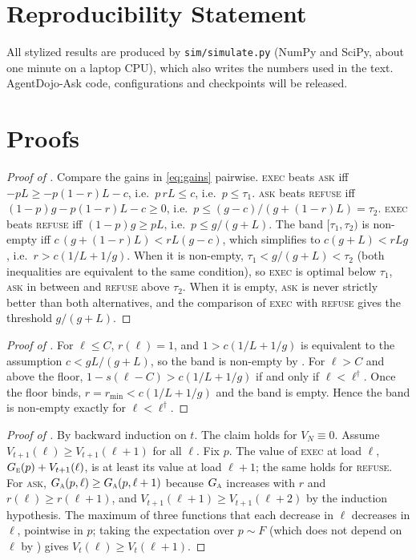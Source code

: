 \documentclass[10pt]{article}
\newcommand{\ASK}{\textup{\textsc{ask}}\xspace}
\newcommand{\EXEC}{\textup{\textsc{exec}}\xspace}
\newcommand{\REFUSE}{\textup{\textsc{refuse}}\xspace}
\newcommand{\ADA}{AgentDojo-Ask\xspace}
\theoremstyle{plain}
\theoremstyle{definition}
\begin{document}
\section*{Reproducibility Statement}
All stylized results are produced by \texttt{sim/simulate.py} (NumPy and SciPy, about one minute on a laptop CPU), which also writes the numbers used in the text. \ADA code, configurations and checkpoints will be released.




\clearpage
\appendix

\section{Proofs}\label{app:proofs}

\begin{proof}[Proof of ]
Compare the gains in \eqref{eq:gains} pairwise. \EXEC beats \ASK iff $-pL\ge -p(1-r)L-c$, i.e.\ $p\,rL\le c$, i.e.\ $p\le\tau_1$. \ASK beats \REFUSE iff $(1-p)g-p(1-r)L-c\ge0$, i.e.\ $p\le(g-c)/(g+(1-r)L)=\tau_2$. \EXEC beats \REFUSE iff $(1-p)g\ge pL$, i.e.\ $p\le g/(g+L)$. The band $[\tau_1,\tau_2)$ is non-empty iff $c\,(g+(1-r)L)<rL(g-c)$, which simplifies to $c(g+L)<rLg$, i.e.\ $r>c(1/L+1/g)$. When it is non-empty, $\tau_1<g/(g+L)<\tau_2$ (both inequalities are equivalent to the same condition), so \EXEC is optimal below $\tau_1$, \ASK in between and \REFUSE above $\tau_2$. When it is empty, \ASK is never strictly better than both alternatives, and the comparison of \EXEC with \REFUSE gives the threshold $g/(g+L)$.
\end{proof}

\begin{proof}[Proof of ]
For $\ell\le C$, $r(\ell)=1$, and $1>c(1/L+1/g)$ is equivalent to the assumption $c<gL/(g+L)$, so the band is non-empty by . For $\ell>C$ and above the floor, $1-s(\ell-C)>c(1/L+1/g)$ if and only if $\ell<\ell^\dagger$. Once the floor binds, $r=r_{\min}<c(1/L+1/g)$ and the band is empty. Hence the band is non-empty exactly for $\ell<\ell^\dagger$.
\end{proof}

\begin{proof}[Proof of ]
By backward induction on $t$. The claim holds for $V_N\equiv0$. Assume $V_{t+1}(\ell)\ge V_{t+1}(\ell+1)$ for all $\ell$. Fix $p$. The value of \EXEC at load $\ell$, $G_{\textsc{e}}(p)+V_{t+1}(\ell)$, is at least its value at load $\ell+1$; the same holds for \REFUSE. For \ASK, $G_{\textsc{a}}(p,\ell)\ge G_{\textsc{a}}(p,\ell+1)$ because $G_{\textsc{a}}$ increases with $r$ and $r(\ell)\ge r(\ell+1)$, and $V_{t+1}(\ell+1)\ge V_{t+1}(\ell+2)$ by the induction hypothesis. The maximum of three functions that each decrease in $\ell$ decreases in $\ell$, pointwise in $p$; taking the expectation over $p\sim F$ (which does not depend on $\ell$ by ) gives $V_t(\ell)\ge V_t(\ell+1)$.
\end{proof}
\end{document}
